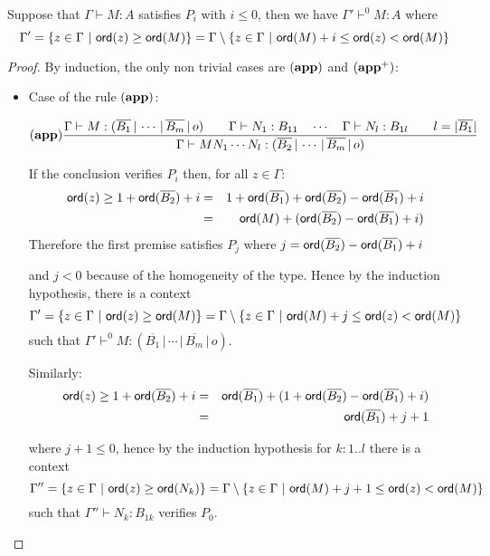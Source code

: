 \begin{lem}
\label{lem:restriction}

Suppose that $\Gamma \vdash M : A$ satisfies $P_i$ with $i\leq0$, then we have
$\Gamma' \vdash^{0} M : A$
where $$\Gamma' = \{ z \in \Gamma \ |
\ \ord{z} \geq \ord{M} \} = \Gamma \setminus \{ z \in \Gamma \ | \ \ord{M} + i \leq \ord{z} < \ord{M} \}$$
\end{lem}
\begin{proof}
By induction, the only non trivial cases are $\mathbf{(app)}$ and $\mathbf{(app^+)}$:
\begin{itemize}
\item Case of the rule $\mathbf{(app)}$:

    \[ (\mathbf{app})
    \frac{\displaystyle {{\Gamma} \vdash {M : (\overline{B_1} \, | \, \cdots \, | \, \overline{B_m} \, | \, o)}} \qquad
            {{\Gamma} \vdash {N_1 : B_{11}}} \quad \cdots \quad {{\Gamma} \vdash {N_{l} :
            B_{1l}}} \qquad l = |\overline{B_1}| }{ {{\Gamma} \vdash {M N_1
            \cdots N_{l} : (\overline{B_2} \, | \, \cdots \, | \,
            \overline{B_m} \, | \, o)}}}
    \]

    If the conclusion verifies $P_i$ then, for all $z \in \Gamma$:
    \begin{eqnarray*}
    {\sf ord}(z) \geq 1 + {\sf ord}(\overline{B_2}) + i
    &=& 1 + {\sf ord}(\overline{B_1}) + {\sf ord}(\overline{B_2}) - {\sf ord}(\overline{B_1}) + i \\
    &=& {\sf ord}(M) + ({\sf ord}(\overline{B_2}) - {\sf ord}(\overline{B_1}) + i)
    \end{eqnarray*}
    Therefore the first premise satisfies $P_j$ where $j={{\sf ord}(\overline{B_2}) - {\sf ord}(\overline{B_1}) + i}$

    and $j< 0$ because of the homogeneity of the type. Hence by the induction hypothesis,
    there is a context $$\Gamma' = \{ z \in \Gamma \ |
    \ \ord{z} \geq \ord{M} \} = \Gamma \setminus \{ z \in \Gamma \ | \ \ord{M} + j \leq \ord{z} < \ord{M} \}$$
    such that $\Gamma' \vdash^{0} M : (\overline{B_1} \, | \, \cdots \, | \, \overline{B_m} \, | \, o)$.


    Similarly:
    \begin{eqnarray*}
    {\sf ord}(z) \geq 1 + {\sf ord}(\overline{B_2}) + i
    &=& {\sf ord}(\overline{B_1}) + (1+{\sf ord}(\overline{B_2}) - {\sf ord}(\overline{B_1}) + i) \\
    &=& {\sf ord}(\overline{B_1}) + j+1
    \end{eqnarray*}

    where $j+1\leq 0$, hence by the induction hypothesis for $k : 1..l$ there is a
    context $$\Gamma'' = \{ z \in \Gamma \ |
    \ \ord{z} \geq \ord{N_k} \} = \Gamma \setminus \{ z \in \Gamma \ | \ \ord{M} + j+1 \leq \ord{z} < \ord{M} \}$$
    such that $\Gamma'' \vdash N_k : B_{1k}$ verifies $P_0$.


\end{itemize}
\end{proof}
